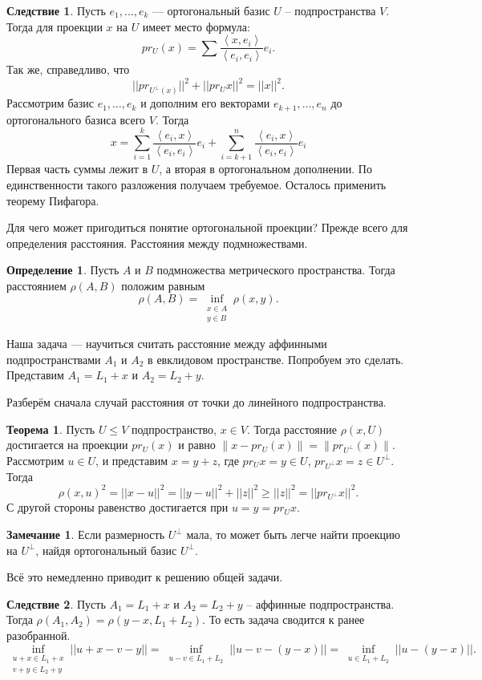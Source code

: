 \documentclass[10pt,a4paper,oneside]{book}
\theoremstyle{definition}
\newtheorem*{rem}{Замечание}
\newtheorem*{defn}{Определение}
\newtheorem{thm}{Теорема}
\newtheorem{cor}{Следствие}
\def\lan{\left\langle }
\def\ran{\right\rangle}
\def\thrm{\begin{thm}}
\def\ethrm{\end{thm}}
\def\dfn{\begin{defn}}
\def\edfn{\end{defn}}
\def\crl{\begin{cor}}
\def\ecrl{\end{cor}}
\def\rm{\begin{rem}}
\def\erm{\end{rem}}
\begin{document}
\crl Пусть $ e_1,\dots, e_k$ --- ортогональный базис $U$ -- подпространства $V$. Тогда для проекции $x$ на $U$ имеет место формула:
$$ pr_U(x)= \sum \frac{\lan x,e_i\ran}{\lan e_i,e_i\ran} e_i.$$
Так же, справедливо, что
$$||pr_{U^{\bot}(x)}||^2 + ||pr_U x||^2=||x||^2.$$
\proof Рассмотрим базис $e_1,\dots, e_k$ и дополним его векторами $e_{k+1},\dots,e_n$ до ортогонального базиса всего $V$. Тогда $$x= \sum_{i=1}^k \frac{\lan e_i,  x\ran}{\lan e_i, e_i\ran}e_i + \sum_{i=k+1}^n \frac{\lan e_i,  x\ran}{\lan e_i, e_i\ran}e_i $$
Первая часть суммы лежит в $U$, а вторая в ортогональном дополнении. По единственности такого разложения получаем требуемое. Осталось применить теорему Пифагора.
\endproof
\ecrl







Для чего может пригодиться понятие ортогональной проекции? Прежде всего для определения расстояния. Расстояния между подмножествами.

\dfn Пусть $A$ и $B$ подмножества метрического пространства. Тогда расстоянием $\rho(A,B)$ положим равным
$$\rho(A,B)=\inf_{\substack{x\in A\\ y \in B}} \rho(x,y).$$
\edfn

Наша задача --- научиться считать расстояние между аффинными подпространствами $A_1$ и $A_2$ в евклидовом пространстве. Попробуем это сделать. Представим $A_1=L_1+x$ и $A_2=L_2+y$. 

Разберём сначала случай расстояния от точки до линейного подпространства. 

\thrm Пусть $U \leq V$ подпространство, $x \in V$. Тогда расстояние $\rho(x,U)$ достигается на проекции  $pr_U(x)$ и равно $\|x-pr_U(x)\|=\|pr_{U^{\bot}}(x)\|$.
\proof Рассмотрим $u \in U$, и представим $x=y+z$, где $pr_Ux=y \in U$, $pr_{U^{\bot}}x =z \in U^{\bot}$. Тогда $$\rho(x,u)^2= ||x-u||^2= ||y - u ||^2+ ||z||^2 \geq ||z||^2=||pr_{U^{\bot}}x||^2 .$$
С другой стороны равенство достигается при $u=y=pr_{U} x$.
\endproof
\ethrm



\rm Если размерность $U^{\bot}$ мала, то может быть легче найти проекцию на $U^{\bot}$, найдя ортогональный базис $U^{\bot}$.
\erm

Всё это немедленно приводит к решению общей задачи.

\crl Пусть  $A_1=L_1+x$ и $A_2=L_2+y$ -- аффинные подпространства. Тогда $\rho(A_1,A_2)=\rho(y-x, L_1+L_2)$. То есть задача сводится к ранее разобранной.
\proof $$\inf_{\substack{u+x\in L_1+x\\ v+y \in L_2+y}} ||u+x-v-y||=\inf_{\substack{u-v\in L_1+ L_2}}||u-v - (y-x)||=\inf_{\substack{u\in L_1+ L_2}}||u- (y-x)||.$$
\endproof
\ecrl
\end{document}

